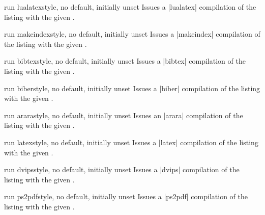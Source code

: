 \begin{docTcbKey}[][doc new=2014-11-14]{run lualatex}{}{style, no default, initially unset}
Issues a |lualatex| compilation of the listing with the given .
\end{docTcbKey}

\begin{docTcbKey}[][doc new=2014-11-14]{run makeindex}{}{style, no default, initially unset}
Issues a |makeindex| compilation of the listing with the given .
\end{docTcbKey}

\begin{docTcbKey}[][doc new=2014-11-14]{run bibtex}{}{style, no default, initially unset}
Issues a |bibtex| compilation of the listing with the given .
\end{docTcbKey}

\begin{docTcbKey}[][doc new=2014-11-14]{run biber}{}{style, no default, initially unset}
Issues a |biber| compilation of the listing with the given .
\end{docTcbKey}

\begin{docTcbKey}[][doc new=2014-11-14]{run arara}{}{style, no default, initially unset}
Issues an |arara| compilation of the listing with the given .
\end{docTcbKey}

\begin{docTcbKey}[][doc new=2014-11-14]{run latex}{}{style, no default, initially unset}
Issues a |latex| compilation of the listing with the given .
\end{docTcbKey}

\begin{docTcbKey}[][doc new=2014-11-14]{run dvips}{}{style, no default, initially unset}
Issues a |dvips| compilation of the listing with the given .
\end{docTcbKey}

\enlargethispage*{1cm}
\begin{docTcbKey}[][doc new=2014-11-14]{run ps2pdf}{}{style, no default, initially unset}
Issues a |ps2pdf| compilation of the listing with the given .
\end{docTcbKey}

